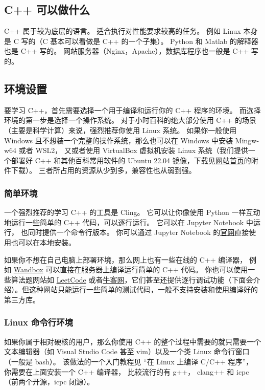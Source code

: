 

\begin{issues}
\issueDraft
\end{issues}

\subsection{C++ 可以做什么}
C++ 属于较为底层的语言。 适合执行对性能要求较高的任务。 例如 Linux 本身是 C 写的（C 基本可以看做是 C++ 的一个子集）。 Python 和 Matlab 的解释器也是 C++ 写的。 网站服务器（Nginx，Apache），数据库程序也一般是 C++ 写的。

\subsection{环境设置}

要学习 C++，首先需要选择一个用于编译和运行你的 C++ 程序的环境。 而选择环境的第一步是选择一个操作系统。 对于小时百科的绝大部分使用 C++ 的场景（主要是科学计算）来说，强烈推荐你使用 Linux 系统。 如果你一般使用 Windows 且不想装一个完整的操作系统，那么也可以在 Windows 中安装 Mingw-w64 或者 WSL2， 又或者使用 VirtualBox 虚拟机安装 Linux 系统（我们提供一个部署好 C++ 和其他百科常用软件的 Ubuntu 22.04 镜像，下载见\href{https://wuli.wiki}{网站首页}的附件下载）。 三者所占用的资源从少到多，兼容性也从弱到强。

\subsubsection{简单环境}
一个强烈推荐的学习 C++ 的工具是 Cling。 它可以让你像使用 Python 一样互动地运行一些简单的 C++ 代码，可以逐行运行。 它可以在 Jupyter Notebook 中运行， 也同时提供一个命令行版本。 你可以通过 Jupyter Notebook 的\href{https://jupyter.org/}{官网}直接使用也可以在本地安装。

如果你不想在自己电脑上部署环境，那么网上也有一些在线的 C++ 编译器， 例如 \href{https://wandbox.org/}{Wandbox} 可以直接在服务器上编译运行简单的 C++ 代码。 你也可以使用一些算法题网站如 \href{https://leetcode.com/}{LeetCode} 或者\href{https://www.nowcoder.com/}{牛客网}，它们甚至还提供逐行调试功能（下面会介绍）。但这种网站只能运行一些简单的测试代码，一般不支持安装和使用编译好的第三方库。

\subsubsection{Linux 命令行环境}
如果你属于相对硬核的用户，那么你使用 C++ 的整个过程中需要的就只需要一个文本编辑器（如 Visual Studio Code 甚至 vim）以及一个类 Linux 命令行窗口（一般是 bash）。 该做法的一个入门教程见 “在 Linux 上编译 C/C++ 程序”， 你需要在上面安装一个 C++ 编译器， 比较流行的有 g++， clang++ 和 icpc（前两个开源，icpc 闭源）。

